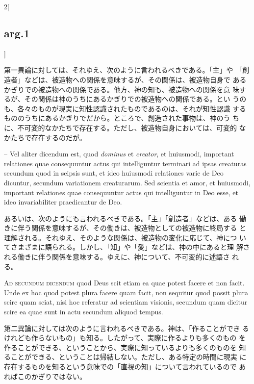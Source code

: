 \documentclass[paper=a4paper,fontsize=10pt,jafontsize=9pt,titlepage]{jlreq}
\begin{document}
\begin{paracol}{2}[\subsection{arg.1}]
\switchcolumn

第一異論に対しては、それゆえ、次のように言われるべきである。「主」や
「創造者」などは、被造物への関係を意味するが、その関係は、被造物自身で
あるかぎりでの被造物への関係である。他方、神の知も、被造物への関係を意
味するが、その関係は神のうちにあるかぎりでの被造物への関係である。とい
うのも、各々のものが現実に知性認識されたものであるのは、それが知性認識
するもののうちにあるかぎりでだから。ところで、創造された事物は、神のう
ちに、不可変的なかたちで存在する。ただし、被造物自身においては、可変的
なかたちで存在するのだが。

\switchcolumn*

-- Vel aliter dicendum est, quod {\itshape dominus} et {\itshape
creator}, et huiusmodi, important relationes quae consequuntur actus
qui intelliguntur terminari ad ipsas creaturas secundum quod in
seipsis sunt, et ideo huiusmodi relationes varie de Deo dicuntur,
secundum variationem creaturarum. Sed scientia et amor, et huiusmodi,
important relationes quae consequuntur actus qui intelliguntur in Deo
esse, et ideo invariabiliter praedicantur de Deo.

\switchcolumn

あるいは、次のようにも言われるべきである。「主」「創造者」などは、ある
働きに伴う関係を意味するが、その働きは、被造物としての被造物に終局する
と理解される。それゆえ、そのような関係は、被造物の変化に応じて、神につ
いてさまざまに語られる。しかし、「知」や「愛」などは、神の中にあると理
解される働きに伴う関係を意味する。ゆえに、神について、不可変的に述語さ
れる。

\switchcolumn*[\subsection{ad.2}]

{\scshape Ad secundum dicendum} quod Deus scit etiam ea quae potest
facere et non facit. Unde ex hoc quod potest plura facere quam facit,
non sequitur quod possit plura scire quam sciat, nisi hoc referatur ad
scientiam visionis, secundum quam dicitur scire ea quae sunt in actu
secundum aliquod tempus.

\switchcolumn

第二異論に対しては次のように言われるべきである。神は、「作ることができ
るけれども作らないもの」も知る。したがって、実際に作るよりも多くのもの
を作ることができる、ということから、実際に知っているよりも多くのものを
知ることができる、ということは帰結しない。ただし、ある特定の時間に現実
に存在するものを知るという意味での「直視の知」について言われているので
あればこのかぎりではない。


\end{paracol}
\end{document}
